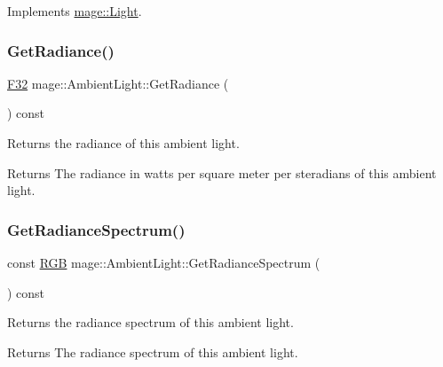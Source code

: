 Implements \hyperlink{classmage_1_1_light_aa613d76a1ebda69efde853d15f75490c}{mage\+::\+Light}.

\hypertarget{classmage_1_1_ambient_light_ab41f72d902f590ebc62ab58427e2bdab}{}\label{classmage_1_1_ambient_light_ab41f72d902f590ebc62ab58427e2bdab} 
\subsubsection{\texorpdfstring{Get\+Radiance()}{GetRadiance()}}
{\footnotesize\ttfamily \hyperlink{namespacemage_aa97e833b45f06d60a0a9c4fc22ae02c0}{F32} mage\+::\+Ambient\+Light\+::\+Get\+Radiance (\begin{DoxyParamCaption}{ }\end{DoxyParamCaption}) const\hspace{0.3cm}{\ttfamily [noexcept]}}

Returns the radiance of this ambient light.

\begin{DoxyReturn}{Returns}
The radiance in watts per square meter per steradians of this ambient light. 
\end{DoxyReturn}
\hypertarget{classmage_1_1_ambient_light_a5d135eeeef619f13435341eebd3fe476}{}\label{classmage_1_1_ambient_light_a5d135eeeef619f13435341eebd3fe476} 
\subsubsection{\texorpdfstring{Get\+Radiance\+Spectrum()}{GetRadianceSpectrum()}}
{\footnotesize\ttfamily const \hyperlink{structmage_1_1_r_g_b}{R\+GB} mage\+::\+Ambient\+Light\+::\+Get\+Radiance\+Spectrum (\begin{DoxyParamCaption}{ }\end{DoxyParamCaption}) const\hspace{0.3cm}{\ttfamily [noexcept]}}

Returns the radiance spectrum of this ambient light.

\begin{DoxyReturn}{Returns}
The radiance spectrum of this ambient light. 
\end{DoxyReturn}
\hypertarget{classmage_1_1_ambient_light_aa8bbeaca08a626b6b5f5447a847724cc}{}\label{classmage_1_1_ambient_light_aa8bbeaca08a626b6b5f5447a847724cc} 
